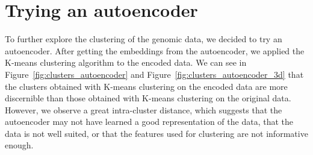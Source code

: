 \section{Trying an autoencoder}
\label{sec:autoencoder}

To further explore the clustering of the genomic data, we decided to try an autoencoder. After getting the embeddings from the autoencoder,
we applied the K-means clustering algorithm to the encoded data. We can see in Figure~\ref{fig:clusters_autoencoder} and
Figure~\ref{fig:clusters_autoencoder_3d} that the clusters obtained with K-means clustering on the encoded data are more discernible
than those obtained with K-means clustering on the original data. However, we observe a great intra-cluster distance, which suggests that the
autoencoder may not have learned a good representation of the data, that the data is not well suited, or that the features used for clustering
are not informative enough.

